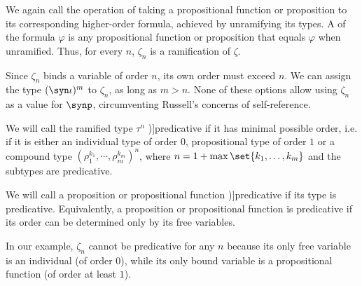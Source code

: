 \begin{definition}
\begin{thmenum}
    We again call  the operation of taking a propositional function or proposition to its corresponding higher-order formula, achieved by unramifying its types. A  of the formula \( \varphi \) is any propositional function or proposition that equals \( \varphi \) when unramified. Thus, for every \( n \), \( \zeta_n \) is a ramification of \( \zeta \).

    Since \( \zeta_n \) binds a variable of order \( n \), its own order must exceed \( n \). We can assign the type \( (\syn\iota)^m \) to \( \zeta_n \), as long as \( m > n \). None of these options allow using \( \zeta_n \) as a value for \( \synp \), circumventing Russell's concerns of self-reference.

     We will call the ramified type \( \tau^n \) \term[en=predicative type (\cite[def. 2.40]{KamareddineLaanNederpelt2005TypeTheory})]{predicative} if it has minimal possible order, i.e. if it is either an individual type of order \( 0 \), propositional type of order \( 1 \) or a compound type \( (\rho_1^{k_1}, \cdots, \rho_m^{k_m})^n \), where \( n = 1 + \max\set{ k_1, \ldots, k_m } \) and the subtypes are predicative.

    We will call a proposition or propositional function \term[en=predicative (function) (\cite[239]{Russell1908TypeTheory})]{predicative} if its type is predicative. Equivalently, a proposition or propositional function is predicative if its order can be determined only by its free variables.

    In our example, \( \zeta_n \) cannot be predicative for any \( n \) because its only free variable is an individual (of order \( 0 \)), while its only bound variable is a propositional function (of order at least \( 1 \)).


\end{thmenum}
\end{definition}
